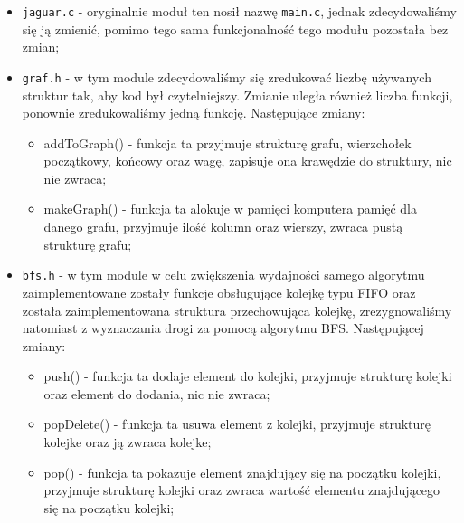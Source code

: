 \documentclass[]{article}
\begin{document}
\begin{itemize}

\item
\texttt{jaguar.c} - oryginalnie moduł ten nosił nazwę \texttt{main.c}, jednak zdecydowaliśmy się ją zmienić, pomimo tego sama funkcjonalność tego modułu pozostała bez zmian;

\item
\texttt{graf.h} - w tym module zdecydowaliśmy się zredukować liczbę używanych struktur tak, aby kod był czytelniejszy. Zmianie uległa również liczba funkcji, ponownie zredukowaliśmy jedną funkcję. Następujące zmiany:
\begin{itemize}
\item
addToGraph() - funkcja ta przyjmuje strukturę grafu, wierzchołek początkowy, końcowy oraz wagę, zapisuje ona krawędzie do struktury, nic nie zwraca;
\item
makeGraph() - funkcja ta alokuje w pamięci komputera pamięć dla danego grafu, przyjmuje ilość kolumn oraz wierszy, zwraca pustą strukturę grafu;
\end{itemize}

\item
\texttt{bfs.h} - w tym module w celu zwiększenia wydajności samego algorytmu zaimplementowane zostały funkcje obsługujące kolejkę typu FIFO oraz została zaimplementowana struktura przechowująca kolejkę, zrezygnowaliśmy natomiast z wyznaczania drogi za pomocą algorytmu BFS. Następującej zmiany:
\begin{itemize}
\item
push() - funkcja ta dodaje element do kolejki, przyjmuje strukturę kolejki oraz element do dodania, nic nie zwraca;
\item
popDelete() - funkcja ta usuwa element z kolejki, przyjmuje strukturę kolejke oraz ją zwraca kolejke;
\item
pop() - funkcja ta pokazuje element znajdujący się na początku kolejki, przyjmuje strukturę kolejki oraz zwraca wartość elementu znajdującego się na początku kolejki;
\end{itemize}


\end{itemize}
\end{document}
